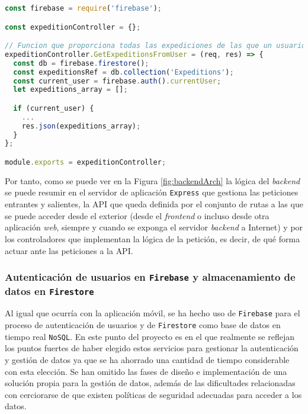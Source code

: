 \begin{lstlisting}[language=javascript,captionpos=t,caption={\textbf{Controlador de expediciones, que gestiona la lógica de la petición.}},label={lst:expController}]
const firebase = require('firebase');

const expeditionController = {};

// Funcion que proporciona todas las expediciones de las que un usuario ha formado parte
expeditionController.GetExpeditionsFromUser = (req, res) => {
  const db = firebase.firestore();
  const expeditionsRef = db.collection('Expeditions');
  const current_user = firebase.auth().currentUser;
  let expeditions_array = [];

  if (current_user) {
    ...
    res.json(expeditions_array);
  }
};

module.exports = expeditionController;
\end{lstlisting}

Por tanto, como se puede ver en la Figura \ref{fig:backendArch} la lógica del \textit{backend} se puede resumir en el servidor de aplicación \texttt{Express} que gestiona las peticiones entrantes y salientes, la \ac{API} que queda definida por el conjunto de rutas a las que se puede acceder desde el exterior (desde el \textit{frontend} o incluso desde otra aplicación \textit{web}, siempre y cuando se exponga el servidor \textit{backend} a Internet) y por los controladores que implementan la lógica de la petición, es decir, de qué forma actuar ante las peticiones a la \ac{API}.

\subsubsection{Autenticación de usuarios en \texttt{Firebase} y almacenamiento de datos en \texttt{Firestore}} 

Al igual que ocurría con la aplicación móvil, se ha hecho uso de \texttt{Firebase} para el proceso de autenticación de usuarios y de \texttt{Firestore} como base de datos en tiempo real \texttt{NoSQL}. En este punto del proyecto es en el que realmente se reflejan los puntos fuertes de haber elegido estos servicios para gestionar la autenticación y gestión de datos ya que se ha ahorrado una cantidad de tiempo considerable con esta elección. Se han omitido las fases de diseño e implementación de una solución propia para la gestión de datos, además de las dificultades relacionadas con cerciorarse de que existen políticas de seguridad adecuadas para acceder a los datos. 

